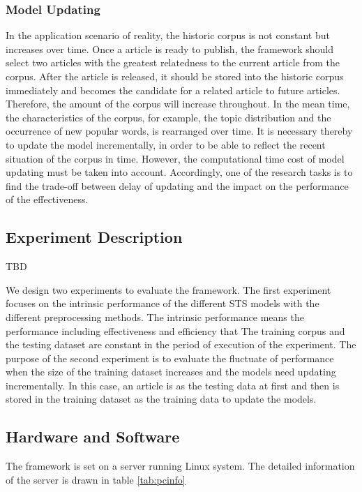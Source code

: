 \subsubsection{Model Updating}

In the application scenario of reality, the historic corpus is not constant but increases over time. Once a article is ready to publish, the framework should select two articles with the greatest relatedness to the current article from the corpus. After the article is released, it should be stored into the historic corpus immediately and becomes the candidate for a related article to future articles. Therefore, the amount of the corpus will increase throughout. In the mean time, the characteristics of the corpus, for example, the topic distribution and the occurrence of new popular words, is rearranged over time. It is necessary thereby to update the model incrementally, in order to be able to reflect the recent situation of the corpus in time. However, the computational time cost of model updating must be taken into account. Accordingly, one of the research tasks is to find the trade-off between delay of updating and the impact on the performance of the effectiveness.  

\subsection{Experiment Description}
\label{sec:4.4}

TBD

We design two experiments to evaluate the framework. The first experiment focuses on the intrinsic performance of the different STS models with the different preprocessing methods. The intrinsic performance means the performance including effectiveness and efficiency that  The training corpus and the testing dataset are constant in the period of execution of the experiment. The purpose of the second experiment is to evaluate the fluctuate of performance when the size of the training dataset increases and the models need updating incrementally. In this case, an article is as the testing data at first and then is stored in the training dataset as the training data to update the models. 

\subsection{Hardware and Software}

The framework is set on a server running Linux system. The detailed information of the server is drawn in table \ref{tab:pcinfo}

